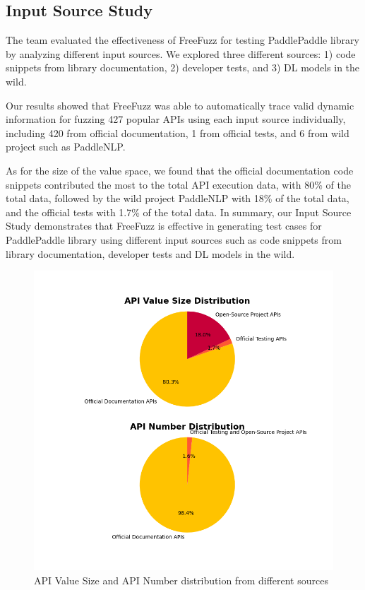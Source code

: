 \documentclass[sigconf]{acmart}
\begin{document}
  \subsection{Input Source Study}
  The team evaluated the effectiveness of FreeFuzz for testing PaddlePaddle library by analyzing different input sources. We explored three different sources: 1) code snippets from library documentation, 2) developer tests, and 3) DL models in the wild.

  Our results showed that FreeFuzz was able to automatically trace valid dynamic information for fuzzing 427 popular APIs using each input source individually, including 420 from official documentation, 1 from official tests, and 6 from wild project such as PaddleNLP.

  As for the size of the value space, we found that the official documentation code snippets contributed the most to the total API execution data, with 80\% of the total data, followed by the wild project PaddleNLP with 18\% of the total data, and the official tests with 1.7\% of the total data.
  In summary, our Input Source Study demonstrates that FreeFuzz is effective in generating test cases for PaddlePaddle library using different input sources such as code snippets from library documentation, developer tests and DL models in the wild. 
  
  \begin{figure}[h]
    \centering
    \includegraphics[width=\linewidth]{APIDist.png}
    \caption{API Value Size and API Number distribution from different sources}
  \end{figure}
\end{document}

